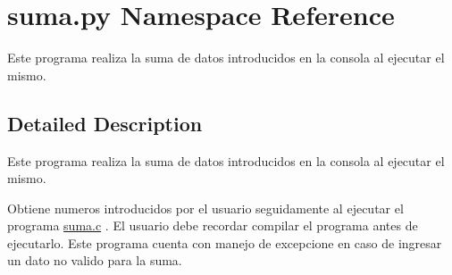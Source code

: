 \hypertarget{namespacesuma_1_1py}{}\section{suma.\+py Namespace Reference}
\label{namespacesuma_1_1py}


Este programa realiza la suma de datos introducidos en la consola al ejecutar el mismo.  




\subsection{Detailed Description}
Este programa realiza la suma de datos introducidos en la consola al ejecutar el mismo. 

Obtiene numeros introducidos por el usuario seguidamente al ejecutar el programa \hyperlink{suma_8c}{suma.\+c} . El usuario debe recordar compilar el programa antes de ejecutarlo. Este programa cuenta con manejo de excepcione en caso de ingresar un dato no valido para la suma. 